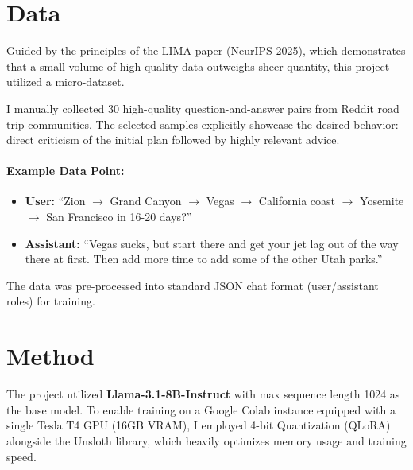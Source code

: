 \documentclass[12pt]{article}
\begin{document}
\section{Data}
Guided by the principles of the LIMA \cite{NEURIPS2023_ac662d74} paper (NeurIPS 2025), which demonstrates that a small volume of high-quality data outweighs sheer quantity, this project utilized a micro-dataset. 

I manually collected 30 high-quality question-and-answer pairs from Reddit road trip communities. The selected samples explicitly showcase the desired behavior: direct criticism of the initial plan followed by highly relevant advice.

\paragraph{Example Data Point:}
\begin{itemize}
    \item \textbf{User:} ``Zion $\rightarrow$ Grand Canyon $\rightarrow$ Vegas $\rightarrow$ California coast $\rightarrow$ Yosemite $\rightarrow$ San Francisco in 16-20 days?''
    \item \textbf{Assistant:} ``Vegas sucks, but start there and get your jet lag out of the way there at first. Then add more time to add some of the other Utah parks.''
\end{itemize}

The data was pre-processed into standard JSON chat format (user/assistant roles) for training.

\section{Method}
The project utilized \textbf{Llama-3.1-8B-Instruct} with max sequence length 1024 as the base model. To enable training on a Google Colab instance equipped with a single Tesla T4 GPU (16GB VRAM), I employed 4-bit Quantization (QLoRA) \cite{10.5555/3666122.3666563} alongside the Unsloth library, which heavily optimizes memory usage and training speed. 
\end{document}
